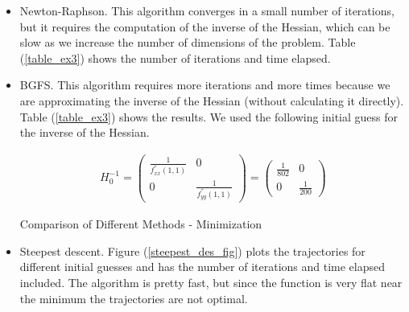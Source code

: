 \documentclass[a4paper,12pt]{article}
\begin{document}
    \begin{itemize}
        \item Newton-Raphson. This algorithm converges in a small number of iterations, but it requires the computation of the inverse of the Hessian, which can be slow as we increase the number of dimensions of the problem. Table (\ref{table_ex3}) shows the number of iterations and time elapsed. 
        
        
        \item BGFS. This algorithm requires more iterations and more times because we are approximating the inverse of the Hessian (without calculating it directly). Table (\ref{table_ex3}) shows the results. We used the following initial guess for the inverse of the Hessian. 
        
        \begin{align*}
            H^{-1}_0 = \begin{pmatrix} \frac{1}{f_{xx}^{''}(1,1)} & 0 \\ 0 & \frac{1}{f_{yy}^{''}(1,1)}  \end{pmatrix} = \begin{pmatrix} \frac{1}{802} & 0 \\ 0 & \frac{1}{200}  \end{pmatrix} 
        \end{align*}
        
        
        
    \begin{table}[!htbp]
        \centering
        \caption[Short Caption for LoT]{Comparison of Different Methods - Minimization}\label{table_ex3}
    \end{table}
        
        \item Steepest descent. Figure (\ref{steepest_des_fig}) plots the trajectories for different initial guesses and has the number of iterations and time elapsed included. The algorithm is pretty fast, but since the function is very flat near the minimum the trajectories are not optimal.  
        

\end{itemize}
\end{document}
